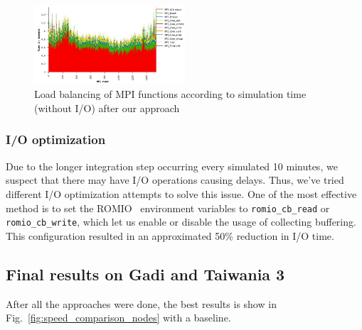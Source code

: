 \begin{figure}[t]
    \centering
    \includegraphics[width=0.5\textwidth]{profile.JPG} 
    \caption{Load balancing of MPI functions according to simulation time (without I/O) after our approach}
    \label{figure:profile-after}
\end{figure}

\subsubsection{I/O optimization}
Due to the longer integration step occurring every simulated 10 minutes, we suspect that there may have I/O operations causing delays. Thus, we've tried different I/O optimization attempts to solve this issue. One of the most effective method is to set the  ROMIO~\cite{ROMIO} environment variables to \texttt{romio\_cb\_read} or \texttt{romio\_cb\_write}, which let us enable or disable the usage of collecting buffering. This configuration resulted in an approximated 50\% reduction in I/O time.

\subsection{Final results on Gadi and Taiwania 3}
After all the approaches were done, the best results is show in Fig.~\ref{fig:speed_comparison_nodes} with a baseline.

